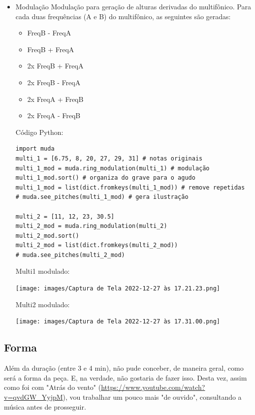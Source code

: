 \documentclass[a4paper]{article}
\begin{document}
\begin{itemize}
\item Modulação
\label{sec:org2738d7c}
Modulação para geração de alturas derivadas do multifônico. Para cada duas frequências (A e B) do multifônico, as seguintes são geradas:

\begin{itemize}
\item FreqB - FreqA
\item FreqB + FreqA
\item 2x FreqB + FreqA
\item 2x FreqB - FreqA
\item 2x FreqA + FreqB
\item 2x FreqA - FreqB
\end{itemize}

Código Python:
\begin{verbatim}
import muda
multi_1 = [6.75, 8, 20, 27, 29, 31] # notas originais
multi_1_mod = muda.ring_modulation(multi_1) # modulação
multi_1_mod.sort() # organiza do grave para o agudo
multi_1_mod = list(dict.fromkeys(multi_1_mod)) # remove repetidas
# muda.see_pitches(multi_1_mod) # gera ilustração

multi_2 = [11, 12, 23, 30.5]
multi_2_mod = muda.ring_modulation(multi_2)
multi_2_mod.sort()
multi_2_mod = list(dict.fromkeys(multi_2_mod)) 
# muda.see_pitches(multi_2_mod)

\end{verbatim}

Multi1 modulado:
\begin{center}
\texttt{[image: images/Captura de Tela 2022-12-27 às 17.21.23.png]}
\end{center}


Multi2 modulado:
\begin{center}
\texttt{[image: images/Captura de Tela 2022-12-27 às 17.31.00.png]}
\end{center}
\end{itemize}


\subsection*{Forma}
\label{sec:org6da7b34}
Além da duração (entre 3 e 4 min), não pude conceber, de maneira geral, como será a forma da peça. E, na verdade, não gostaria de fazer isso. Desta vez, assim como foi com "Atrás do vento" (\url{https://www.youtube.com/watch?v=qvdGW\_YyjpM}), vou trabalhar um pouco mais "de ouvido", consultando a música antes de prosseguir.
\end{document}
